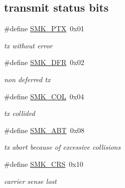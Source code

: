 \subsection*{transmit status bits}
\begin{DoxyCompactItemize}
\item 
\mbox{\label{group__gumstix__dp8390_ga02b6816b816ec2f396d26ba5ef5f083c}} 
\#define \mbox{\hyperlink{group__gumstix__dp8390_ga02b6816b816ec2f396d26ba5ef5f083c}{S\+M\+K\+\_\+\+P\+TX}}~0x01
\begin{DoxyCompactList}\small\item\em tx without error \end{DoxyCompactList}\item 
\mbox{\label{group__gumstix__dp8390_gaf288f612ab0e31863c06ee3376c06675}} 
\#define \mbox{\hyperlink{group__gumstix__dp8390_gaf288f612ab0e31863c06ee3376c06675}{S\+M\+K\+\_\+\+D\+FR}}~0x02
\begin{DoxyCompactList}\small\item\em non deferred tx \end{DoxyCompactList}\item 
\mbox{\label{group__gumstix__dp8390_gae6a3944303a1aeed003d625538531974}} 
\#define \mbox{\hyperlink{group__gumstix__dp8390_gae6a3944303a1aeed003d625538531974}{S\+M\+K\+\_\+\+C\+OL}}~0x04
\begin{DoxyCompactList}\small\item\em tx collided \end{DoxyCompactList}\item 
\mbox{\label{group__gumstix__dp8390_gaaccb4de40a8d3f129b5a22186a886aca}} 
\#define \mbox{\hyperlink{group__gumstix__dp8390_gaaccb4de40a8d3f129b5a22186a886aca}{S\+M\+K\+\_\+\+A\+BT}}~0x08
\begin{DoxyCompactList}\small\item\em tx abort because of excessive collisions \end{DoxyCompactList}\item 
\mbox{\label{group__gumstix__dp8390_ga697ade764858a63f57d1fa8b4dbc3163}} 
\#define \mbox{\hyperlink{group__gumstix__dp8390_ga697ade764858a63f57d1fa8b4dbc3163}{S\+M\+K\+\_\+\+C\+RS}}~0x10
\begin{DoxyCompactList}\small\item\em carrier sense lost \end{DoxyCompactList}\item 

\end{DoxyCompactItemize}
